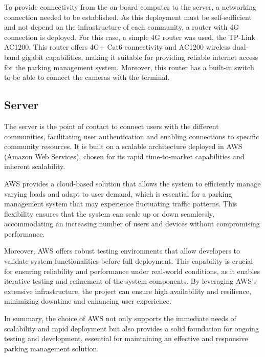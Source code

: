 To provide connectivity from the on-board computer to the server, a networking connection needed to be established. As this deployment must be self-sufficient and not depend on the infrastructure of each community, a router with 4G connection is deployed. For this case, a simple 4G router was used, the TP-Link AC1200. This router offers 4G+ Cat6 connectivity and AC1200 wireless dual-band gigabit capabilities, making it suitable for providing reliable internet access for the parking management system. Moreover, this router has a built-in switch to be able to connect the cameras with the terminal.

\subsection{Server}

The server is the point of contact to connect users with the different communities, facilitating user authentication and enabling connections to specific community resources. It is built on a scalable architecture deployed in AWS (Amazon Web Services), chosen for its rapid time-to-market capabilities and inherent scalability.

AWS provides a cloud-based solution that allows the system to efficiently manage varying loads and adapt to user demand, which is essential for a parking management system that may experience fluctuating traffic patterns. This flexibility ensures that the system can scale up or down seamlessly, accommodating an increasing number of users and devices without compromising performance.

Moreover, AWS offers robust testing environments that allow developers to validate system functionalities before full deployment. This capability is crucial for ensuring reliability and performance under real-world conditions, as it enables iterative testing and refinement of the system components. By leveraging AWS's extensive infrastructure, the project can ensure high availability and resilience, minimizing downtime and enhancing user experience.

In summary, the choice of AWS not only supports the immediate needs of scalability and rapid deployment but also provides a solid foundation for ongoing testing and development, essential for maintaining an effective and responsive parking management solution.


